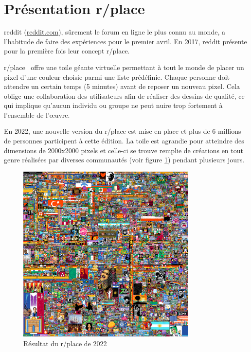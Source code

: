 \section{Présentation r/place}
\gls{reddit} (\href{https://www.reddit.com}{reddit.com}), sûrement le forum en ligne le plus connu au monde, a l'habitude de faire des expériences pour le premier avril. En 2017, \gls{reddit} présente pour la première fois leur concept r/place.

r/place~\cite{rplace} offre une toile géante virtuelle permettant à tout le monde de placer un pixel d'une couleur choisie parmi une liste prédéfinie. Chaque personne doit attendre un certain temps (5 minutes) avant de reposer un nouveau pixel. Cela oblige une collaboration des utilisateurs afin de réaliser des dessins de qualité, ce qui implique qu'aucun individu ou groupe ne peut nuire trop fortement à l'ensemble de l'\oe{}uvre.

En 2022, une nouvelle version du r/place est mise en place et plus de 6 millions de personnes participent à cette édition. La toile est agrandie pour atteindre des dimensions de 2000x2000 pixels et celle-ci se trouve remplie de créations en tout genre réalisées par diverses communautés (voir figure \ref{fig:rplace2022}) pendant plusieurs jours.

\begin{figure}[H]
  \centering
  \includegraphics[width=0.8\textwidth]{./assets/figures/rplace.png}
  \caption{Résultat du r/place de 2022}
  \label{fig:rplace2022}
\end{figure}

